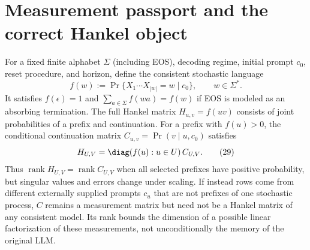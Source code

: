 \documentclass[11pt,a4paper,oneside]{book}
\DeclareMathOperator{\rank}{rank}\DeclareMathOperator{\Tr}{Tr}
\begin{document}
\section*{Measurement passport and the correct Hankel object}
For a fixed finite alphabet $\Sigma$ (including EOS), decoding regime, initial prompt $c_0$, reset procedure, and horizon, define the consistent stochastic language
\[f(w):=\Pr\{X_1\cdots X_{|w|}=w\mid c_0\},\qquad w\in\Sigma^*.\]
It satisfies $f(\epsilon)=1$ and $\sum_{a\in\Sigma}f(wa)=f(w)$ if EOS is modeled as an absorbing termination. The full Hankel matrix $H_{u,v}=f(uv)$ consists of joint probabilities of a prefix and continuation. For a prefix with $f(u)>0$, the conditional continuation matrix $C_{u,v}=\Pr(v\mid u,c_0)$ satisfies
\begin{equation}H_{U,V}=\diag(f(u):u\in U)\,C_{U,V}.\tag{29}\end{equation}
Thus $\rank H_{U,V}=\rank C_{U,V}$ when all selected prefixes have positive probability, but singular values and errors change under scaling. If instead rows come from different externally supplied prompts $c_u$ that are not prefixes of one stochastic process, $C$ remains a measurement matrix but need not be a Hankel matrix of any consistent model. Its rank bounds the dimension of a possible linear factorization of these measurements, not unconditionally the memory of the original LLM.
\end{document}
